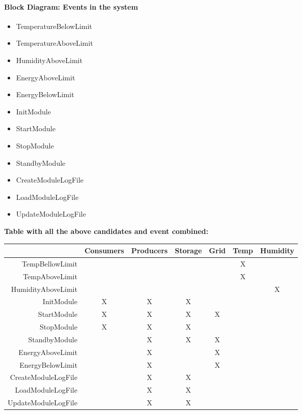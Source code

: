 			\paragraph{Block Diagram: Events in the system}
				\begin{itemize}
					\item TemperatureBelowLimit
					\item TemperatureAboveLimit
					\item HumidityAboveLimit
					\item EnergyAboveLimit
					\item EnergyBelowLimit
					\item InitModule
					\item StartModule
					\item StopModule
					\item StandbyModule
					\item CreateModuleLogFile
					\item LoadModuleLogFile
					\item UpdateModuleLogFile
				\end{itemize}
				\textbf{Table with all the above candidates and event combined:}
				\begin{table}[h!]
					\begin{tabular}{| r | c | c | c | c | c | c |}
					\hline
					~ & Consumers & Producers & Storage & Grid &Temp & Humidity \\ \hline
					TempBellowLimit & ~ & ~ & ~ & ~ & X & ~ \\ \hline
					TempAboveLimit & ~ & ~ & ~ & ~ & X & ~ \\ \hline
					HumidityAboveLimit & ~ & ~ & ~ & ~ & ~ & X \\ \hline
					InitModule & X & X & X & ~ & ~ & ~ \\ \hline
					StartModule & X & X & X & X & ~ & ~ \\ \hline
					StopModule & X & X & X & ~ & ~ & ~ \\ \hline
					StandbyModule & ~ & X & X & X & ~ & ~ \\ \hline
					EnergyAboveLimit & ~ & X & ~ & X & ~ & ~ \\ \hline
					EnergyBelowLimit & ~ & X & ~ & X & ~ & ~ \\ \hline
					CreateModuleLogFile & ~ & X & X & ~ & ~ & ~ \\ \hline
					LoadModuleLogFile & ~ & X & X & ~ & ~ & ~ \\ \hline
					UpdateModuleLogFile & ~ & X & X & ~ & ~ & ~ \\ \hline
					\end{tabular}
				\end{table}
			\newpage

